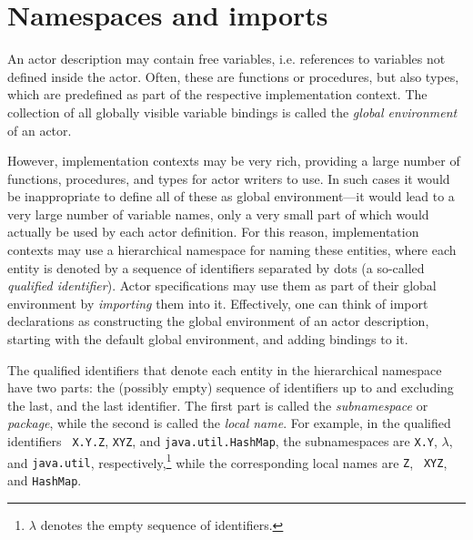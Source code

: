 \section{Namespaces and imports}\label{sect:Imports}


An actor description may contain free variables, i.e. references to
variables not defined inside the actor. Often, these are functions or
procedures, but also types, which are predefined as part of the
respective implementation context. The collection of all globally
visible variable bindings is called the
{\em global environment} of an actor.

However, implementation contexts may be very rich, providing a large
number of functions, procedures, and types for actor writers to use.
In such cases it would be
inappropriate to define all of these as global environment---it would
lead to a very large number of variable names, only a very small part
of which would actually be used by each actor definition. For this
reason, implementation contexts may use a hierarchical namespace for
naming these entities, where each entity is denoted by a sequence of
identifiers separated by dots (a so-called {\em qualified
  identifier}). Actor specifications may use them as part of their
global environment by {\em importing} them into it. Effectively, one can think of import
declarations as constructing the global environment of an actor
description, starting with the default global environment, and adding
bindings to it.

The qualified
identifiers that denote each entity in the hierarchical namespace have
two parts: the (possibly empty) sequence of identifiers up to and
excluding the last, and the last identifier. The first part is called
the {\em subnamespace} or {\em package}, while the second is called
the {\em local name}. For example, in the qualified identifiers {\tt
  X.Y.Z}, {\tt XYZ}, and {\tt java.util.HashMap}, the subnamespaces
are {\tt X.Y}, $\lambda$, and {\tt java.util},
respectively,\footnote{$\lambda$ denotes the empty sequence of
  identifiers.}  while the corresponding local names are {\tt Z}, {\tt
  XYZ}, and {\tt HashMap}.

